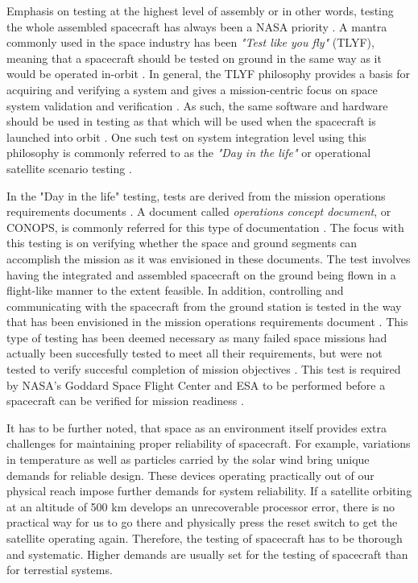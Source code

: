\documentclass[english,12pt,a4paper,pdftex,elec,utf8]{aaltothesis}
\begin{document}
Emphasis on testing at the highest level of assembly or in other words, testing the whole assembled spacecraft has always been a NASA priority \cite{reliabilitylessonsfromnasa}. A mantra commonly used in the space industry has been \textit{"Test like you fly"} (TLYF), meaning that a spacecraft should be tested on ground in the same way as it would be operated in-orbit \cite{satverplanning, tor}.  In general, the TLYF philosophy provides a basis for acquiring and verifying a system and gives a mission-centric focus on space system validation and verification \cite{tor}. As such, the same software and hardware should be used in testing as that which will be used when the spacecraft is launched into orbit \cite{satverplanning}. One such test on system integration level using this philosophy is commonly referred to as the  \textit{"Day in the life"} or operational satellite scenario testing \cite{satverplanning, tor}. \par
In the "Day in the life" testing, tests are derived from the mission operations requirements documents \cite{tor}. A document called \textit{operations concept document}, or CONOPS, is commonly referred for this type of documentation \cite{tor, nasahandbook}. The focus with this testing is on verifying whether the space and ground segments can accomplish the mission as it was envisioned in these documents. The test involves having the integrated and assembled spacecraft on the ground being flown in a flight-like manner to the extent feasible. In addition, controlling and communicating with the spacecraft from the ground station is tested in the way that has been envisioned in the mission operations requirements document \cite{tor, nasahandbook}. This type of testing has been deemed necessary as many failed space missions had actually been succesfully tested to meet all their requirements, but were not tested to verify succesful completion of mission objectives \cite{tor}. This test is required by NASA's Goddard Space Flight Center and ESA to be performed before a spacecraft can be verified for mission readiness \cite{tor, ecss}. \par
It has to be further noted, that space as an environment itself provides extra challenges for maintaining proper reliability of spacecraft. For example, variations in temperature as well as particles carried by the solar wind bring unique demands for reliable design. These devices operating practically out of our physical reach impose further demands for system reliability. If a satellite orbiting at an altitude of 500 km develops an unrecoverable processor error, there is no practical way for us to go there and physically press the reset switch to get the satellite operating again. Therefore, the testing of spacecraft has to be thorough and systematic. Higher demands are usually set for the testing of spacecraft than for terrestial systems. \cite{spacesystemsengineering} \par 
\end{document}
